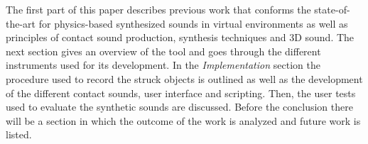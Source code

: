 The first part of this paper describes previous work that conforms the state-of-the-art for physics-based synthesized sounds in virtual environments as well as principles of contact sound production, synthesis techniques and 3D sound. The next section gives an overview of the tool and goes through the different instruments used for its development. In the \textit{Implementation} section the procedure used to record the struck objects is outlined as well as the development of the different contact sounds, user interface and scripting. Then, the user tests used to evaluate the synthetic sounds are discussed. Before the conclusion there will be a section in which the outcome of the work is analyzed and future work is listed.







